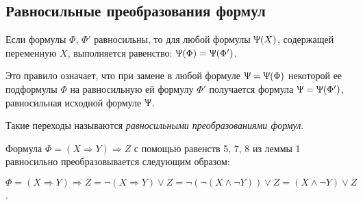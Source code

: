 \subsection*{Равносильные преобразования формул}

\begin{lemma} 
    Если формулы $\Phi$, $\Phi '$ равносильны, то для любой формулы $\Uppsi(X)$, содержащей переменную $X$, выполняется равенство: $\Uppsi(\Phi) = \Uppsi(\Phi')$.
\end{lemma}

Это правило означает, что при замене в любой формуле $\Uppsi = \Uppsi(\Phi)$ некоторой ее подформулы $\Phi$ на равносильную ей формулу $\Phi'$ получается формула $\Uppsi = \Uppsi(\Phi')$, равносильная исходной формуле $\Uppsi$.

Такие переходы называются \textit{равносильными преобразованиями формул}.

\begin{example}
    Формула $\Phi = (X\Rightarrow Y) \Rightarrow Z$ с помощью равенств 5, 7, 8 из леммы 1 равносильно преобразовывается следующим образом:

    $\Phi = (X\Rightarrow Y)\Rightarrow Z = \lnot(X\Rightarrow Y)\lor Z = \lnot(\lnot(X\land\lnot Y))\lor Z = (X\land \lnot Y)\lor Z$.
\end{example}
